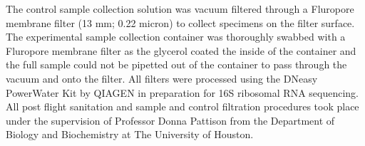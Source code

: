 The control sample collection solution was vacuum filtered through a Fluropore membrane filter (13 mm; 0.22 micron) to collect specimens on the filter surface. The experimental sample collection container was thoroughly swabbed with a Fluropore membrane filter as the glycerol coated the inside of the container and the full sample could not be pipetted out of the container to pass through the vacuum and onto the filter. All filters were processed using the DNeasy PowerWater Kit by QIAGEN in preparation for 16S ribosomal RNA sequencing. All post flight sanitation and sample and control filtration procedures took place under the supervision of Professor Donna Pattison from the Department of Biology and Biochemistry at The University of Houston.









